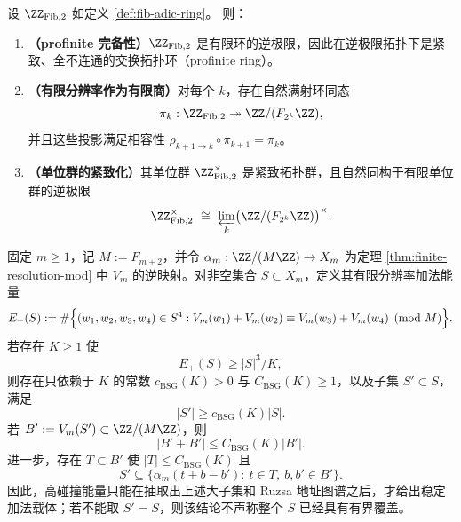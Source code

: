 \begin{proposition}\label{prop:fib-adic-basic}
设 $\ZZ_{\mathrm{Fib},2}$ 如定义 \ref{def:fib-adic-ring}。
则：
\begin{enumerate}
  \item \textbf{（profinite 完备性）}$\ZZ_{\mathrm{Fib},2}$ 是有限环的逆极限，因此在逆极限拓扑下是紧致、全不连通的交换拓扑环（profinite ring）。
  \item \textbf{（有限分辨率作为有限商）}对每个 $k$，存在自然满射环同态
  \[
  \pi_k:\ZZ_{\mathrm{Fib},2}\twoheadrightarrow \ZZ/(F_{2^k}\ZZ),
  \]
  并且这些投影满足相容性 $\rho_{k+1\to k}\circ \pi_{k+1}=\pi_k$。
  \item \textbf{（单位群的紧致化）}其单位群 $\ZZ_{\mathrm{Fib},2}^\times$ 是紧致拓扑群，且自然同构于有限单位群的逆极限
  \[
  \ZZ_{\mathrm{Fib},2}^\times\ \cong\ \varprojlim_k \bigl(\ZZ/(F_{2^k}\ZZ)\bigr)^\times.
  \]
\end{enumerate}
\end{proposition}
\begin{theorem}[高稳定加法能量的有界地址图谱]\label{thm:distill-stable-add-energy-covering-atlas}
固定 \(m\geq 1\)，记 \(M:=F_{m+2}\)，并令
\(
\alpha_m:\ZZ/(M\ZZ)\to X_m
\)
为定理 \ref{thm:finite-resolution-mod} 中 \(V_m\) 的逆映射。对非空集合 \(S\subset X_m\)，定义其有限分辨率加法能量
\[
E_+(S):=\#\Bigl\{(w_1,w_2,w_3,w_4)\in S^4:
V_m(w_1)+V_m(w_2)\equiv V_m(w_3)+V_m(w_4)\pmod M\Bigr\}.
\]
若存在 \(K\geq 1\) 使
\[
E_+(S)\geq |S|^3/K,
\]
则存在只依赖于 \(K\) 的常数
\(
 c_{\mathrm{BSG}}(K)>0
\)
与
\(
 C_{\mathrm{BSG}}(K)\geq 1
\)，以及子集 \(S'\subset S\)，满足
\[
|S'|\geq c_{\mathrm{BSG}}(K)|S|.
\]
若 \(B':=V_m(S')\subset\ZZ/(M\ZZ)\)，则
\[
|B'+B'|\leq C_{\mathrm{BSG}}(K)|B'|.
\]
进一步，存在 \(T\subset B'\) 使 \(|T|\leq C_{\mathrm{BSG}}(K)\) 且
\[
S'\subseteq
\bigl\{\alpha_m(t+b-b'):\ t\in T,\ b,b'\in B'\bigr\}.
\]
因此，高碰撞能量只能在抽取出上述大子集和 Ruzsa 地址图谱之后，才给出稳定加法载体；若不能取 \(S'=S\)，则该结论不声称整个 \(S\) 已经具有有界覆盖。
\end{theorem}
